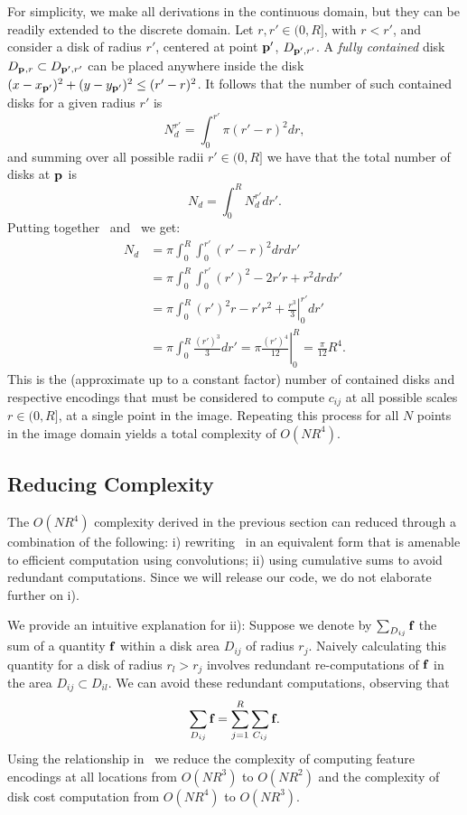 \documentclass[10pt,twocolumn,letterpaper]{article}
\begin{document}
For simplicity, we make all derivations in the continuous domain, but they can be readily extended to the discrete domain.
Let $r,r'\in(0,R]$, with $r<r'$, and consider a disk of radius $r'$, centered at point $\mathbf{p}_{}'$, $D_{\mathbf{p}_{}',r'}$.
A \emph{fully contained} disk $D_{\mathbf{p}_{},r} \subset D_{\mathbf{p}_{}',r'}$ can be placed anywhere inside the disk
$(x-x_{\mathbf{p}_{}'})^2 + (y-y_{\mathbf{p}_{}'})^2 \leq (r'-r)^2$.
It follows that the number of such contained disks for a given radius $r'$ is
\begin{equation}
N_d^{r'} = \int_{0}^{r'}  \pi (r'-r)^2 dr,\label{eq:ndr}
\end{equation}
and summing over all possible radii $r'\in(0,R]$ we have that the total number of disks at $\mathbf{p}_{}$ is
\begin{equation}
N_d = \int_0^R N_d^{r'}dr'.\label{eq:nd}
\end{equation}
Putting together~ and~ we get:
\begin{align}
\nonumber
N_d & = \pi \int_0^{R} \int_0^{r'} (r'-r)^2 dr dr' \\ \nonumber
  & = \pi \int_0^{R} \int_0^{r'} (r')^2 -2r'r + r^2 dr dr' \\ \nonumber
  & = \pi \int_0^{R} \left. (r')^2 r - r'r^2 + \frac{r^3}{3} \right \rvert_{0}^{r'} dr' \\ 
  & = \pi \int_0^{R}  \frac{(r')^3}{3} dr' = \pi \left. \frac{(r')^4}{12}\right \rvert_0^R  = \frac{\pi}{12} R^4. 
\end{align}
This is the (approximate up to a constant factor) number of contained disks and respective encodings that must be considered to compute $c_{ij}$ at
all possible scales $r \in (0,R]$, at a single point in the image.
Repeating this process for all $N$ points in the image domain yields a total complexity of $O(NR^4)$.

\subsection{Reducing Complexity}\label{sec:complexity:reducing}
The $O(NR^4)$ complexity derived in the previous section can reduced through a combination of the following: 
i) rewriting~ in an equivalent form that is amenable to efficient computation using convolutions; 
ii) using cumulative sums to avoid redundant computations.
Since we will release our code, we do not elaborate further on i).

We provide an intuitive explanation for ii):
Suppose we denote by $\sum_{D_{ij}} \mathbf{f}_{}$ the sum of a quantity $\mathbf{f}_{}$ within a disk area $D_{ij}$ of radius $r_j$.
Naively calculating this quantity for a disk of radius $r_l > r_j$ involves redundant re-computations of $\mathbf{f}_{}$
in the area $D_{ij} \subset D_{il}$.
We can avoid these redundant computations, observing that 
\begin{equation}
\sum_{D_{ij}} \mathbf{f}_{} = \sum_{j=1}^R \sum_{C_{ij}} \mathbf{f}_{}. \label{eq:circlesum}
\end{equation}
Using the relationship in~ we reduce the complexity of computing feature encodings at all locations from
$O(NR^3)$ to $O(NR^2)$ and the complexity of disk cost computation from $O(NR^4)$ to $O(NR^3)$.
\end{document}
